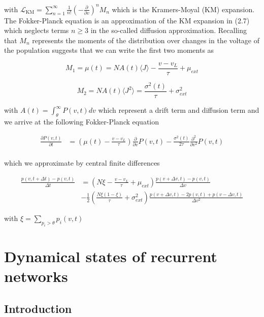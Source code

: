 \documentclass{ucetd}
\begin{document}
with $ \mathcal{L}_{\mathrm{KM}} =\sum_{n=1}^{\infty} \frac{1}{n!}\left(-\frac{\partial}{\partial v}\right)^{n} M_{n}$  which is the Kramers-Moyal (KM) expansion. The Fokker-Planck equation is an approximation of the KM expansion in (2.7) which neglects terms $n\geq 3$ in the so-called diffusion approximation. Recalling that $M_{n}$ represents the moments of the distribution over changes in the voltage of the population suggests that we can write the first two moments as

\begin{equation*}
M_{1} = \mu(t) = NA(t)\langle J\rangle - \frac{v-v_{L}}{\tau} + \mu_{ext}
\end{equation*}

\begin{equation*}
M_{2} = NA(t)\langle J^{2}\rangle = \frac{\sigma^{2}(t)}{\tau} + \sigma_{ext}^{2}
\end{equation*}

with $A(t) = \int_{\theta}^{\infty} P(v,t)dv$ which represent a drift term and diffusion term and we arrive at the following Fokker-Planck equation

\begin{align*}
\frac{\partial P(v,t)}{\partial t} &= \left(\mu(t) - \frac{v-v_{L}}{\tau}\right) \frac{\partial}{\partial v} P(v,t) - \frac{\sigma^{2}(t)}{2\tau}\frac{\partial^{2}}{\partial v^{2}} P(v,t)\\
\end{align*} 

which we approximate by central finite differences

\begin{align*}
\frac{p(v, t+\Delta t) - p(v,t)}{\Delta t} &= \left(N\xi - \frac{v-v_{L}}{\tau}+ \mu_{ext}\right)\frac{p(v+\Delta v, t) - p(v,t)}{\Delta v} \\
&- \frac{1}{2}\left(\frac{N\xi(1-\xi)}{\tau} + \sigma_{ext}^{2}\right)\frac{p(v+\Delta v, t) - 2p(v,t) + p(v-\Delta v, t)}{\Delta v^{2}}
\end{align*} 

with $\xi = \sum_{p_{i} > \theta}p_{i}(v,t)$


\chapter{Dynamical states of recurrent networks}
\section{Introduction}
\end{document}
